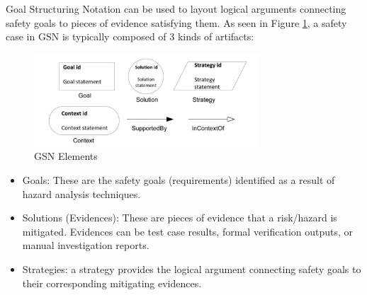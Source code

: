 \documentclass[11pt]{article}
\begin{document}
Goal Structuring Notation \cite{Kelly} can be used to layout logical arguments connecting safety goals to pieces of evidence satisfying them. As seen in Figure \ref{fig:gsn}, a safety case in GSN is typically composed of 3 kinds of artifacts:

\begin{figure}
  \centering
  \includegraphics[width=0.75\textwidth]{gsn}
  \caption{GSN Elements}
  \label{fig:gsn}
\end{figure}

\begin{itemize}
\item Goals: These are the safety goals (requirements) identified as a result of hazard analysis techniques.
\item Solutions (Evidences): These are pieces of evidence that a risk/hazard is mitigated. Evidences can be test case results, formal verification outputs, or manual investigation reports.
\item Strategies: a strategy provides the logical argument connecting safety goals to their corresponding mitigating evidences.
\end{itemize}
\end{document}

